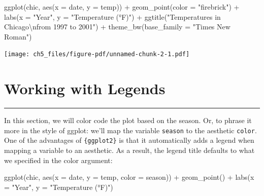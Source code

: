 \documentclass[
  letterpaper,
]{scrbook}
\newenvironment{Shaded}{\begin{snugshade}}{\end{snugshade}}
\newcommand{\AttributeTok}[1]{\textcolor[rgb]{0.40,0.45,0.13}{#1}}
\newcommand{\FunctionTok}[1]{\textcolor[rgb]{0.28,0.35,0.67}{#1}}
\newcommand{\NormalTok}[1]{\textcolor[rgb]{0.00,0.23,0.31}{#1}}
\newcommand{\SpecialCharTok}[1]{\textcolor[rgb]{0.37,0.37,0.37}{#1}}
\newcommand{\StringTok}[1]{\textcolor[rgb]{0.13,0.47,0.30}{#1}}
\begin{document}
\begin{Shaded}
\begin{Highlighting}[]
\FunctionTok{ggplot}\NormalTok{(chic, }\FunctionTok{aes}\NormalTok{(}\AttributeTok{x =}\NormalTok{ date, }\AttributeTok{y =}\NormalTok{ temp)) }\SpecialCharTok{+}
    \FunctionTok{geom\_point}\NormalTok{(}\AttributeTok{color =} \StringTok{"firebrick"}\NormalTok{) }\SpecialCharTok{+}
    \FunctionTok{labs}\NormalTok{(}\AttributeTok{x =} \StringTok{"Year"}\NormalTok{, }\AttributeTok{y =} \StringTok{"Temperature (°F)"}\NormalTok{) }\SpecialCharTok{+}
    \FunctionTok{ggtitle}\NormalTok{(}\StringTok{"Temperatures in Chicago}\SpecialCharTok{\textbackslash{}n}\StringTok{from 1997 to 2001"}\NormalTok{) }\SpecialCharTok{+}
    \FunctionTok{theme\_bw}\NormalTok{(}\AttributeTok{base\_family =} \StringTok{"Times New Roman"}\NormalTok{)}
\end{Highlighting}
\end{Shaded}

\texttt{[image: ch5\_files/figure-pdf/unnamed-chunk-2-1.pdf]}


\chapter{Working with Legends}\label{legends}

\begin{center}\rule{0.5\linewidth}{0.5pt}\end{center}

In this section, we will color code the plot based on the season. Or, to
phrase it more in the style of ggplot: we'll map the variable
\texttt{season} to the aesthetic \texttt{color}. One of the advantages
of \texttt{\{ggplot2\}} is that it automatically adds a legend when
mapping a variable to an aesthetic. As a result, the legend title
defaults to what we specified in the color argument:

\begin{Shaded}
\begin{Highlighting}[]
\FunctionTok{ggplot}\NormalTok{(chic,}
       \FunctionTok{aes}\NormalTok{(}\AttributeTok{x =}\NormalTok{ date, }\AttributeTok{y =}\NormalTok{ temp, }\AttributeTok{color =}\NormalTok{ season)) }\SpecialCharTok{+}
  \FunctionTok{geom\_point}\NormalTok{() }\SpecialCharTok{+}
  \FunctionTok{labs}\NormalTok{(}\AttributeTok{x =} \StringTok{"Year"}\NormalTok{, }\AttributeTok{y =} \StringTok{"Temperature (°F)"}\NormalTok{)}
\end{Highlighting}
\end{Shaded}
\end{document}
